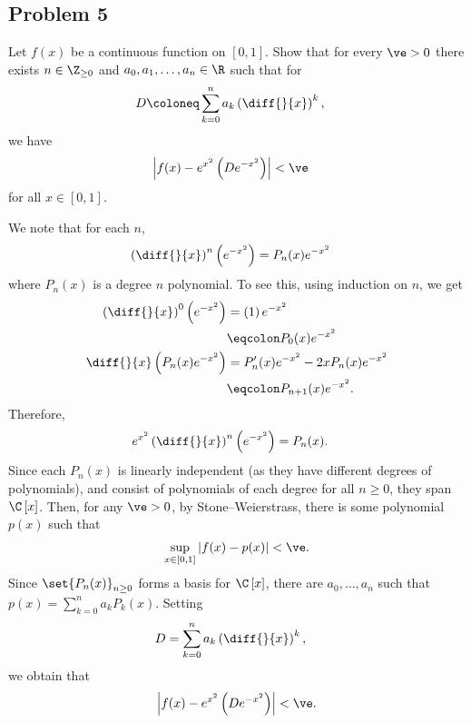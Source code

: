\documentclass[10pt]{mypackage}
\begin{document}
\subsection{Problem 5}%
\begin{problem}
  Let $f(x)$ be a continuous function on $[0,1]$. Show that for every $\ve > 0$ there exists $n\in \Z_{\geq 0}$ and $a_0,a_1,\dots,a_n\in \R$ such that for
  \begin{align*}
    D &\coloneq \sum_{k=0}^{n} a_k\left( \diff{}{x} \right)^{k},
  \end{align*}
  we have
  \begin{align*}
    \left\vert f(x)-e^{x^2}\left( De^{-x^2} \right) \right\vert &< \ve
  \end{align*}
  for all $x\in [0,1]$.
\end{problem}
We note that for each $n$,
\begin{align*}
  \left( \diff{}{x} \right)^{n}\left( e^{-x^2} \right) &= P_n(x)e^{-x^2}
\end{align*}
where $P_n(x)$ is a degree $n$ polynomial. To see this, using induction on $n$, we get
\begin{align*}
  \left( \diff{}{x} \right)^{0}\left( e^{-x^2} \right) &= \left( 1 \right)e^{-x^2}\\
                                                       &\eqcolon P_0(x)e^{-x^2}\\
  \diff{}{x}\left( P_n(x)e^{-x^2} \right) &= P_n'(x)e^{-x^2} - 2xP_n(x)e^{-x^2}\\
                                          &\eqcolon P_{n+1}(x)e^{-x^2}.
\end{align*}
Therefore,
\begin{align*}
  e^{x^2}\left( \diff{}{x} \right)^{n}\left( e^{-x^2} \right) &= P_n(x).
\end{align*}
Since each $P_n(x)$ is linearly independent (as they have different degrees of polynomials), and consist of polynomials of each degree for all $n\geq 0$, they span $\C\left[ x \right]$. Then, for any $\ve > 0$, by Stone--Weierstrass, there is some polynomial $p(x)$ such that
\begin{align*}
  \sup_{x\in [0,1]}\left\vert f(x) - p(x) \right\vert < \ve.
\end{align*}
Since $\set{P_n(x)}_{n\geq 0}$ forms a basis for $\C\left[ x \right]$, there are $a_0,\dots,a_n$ such that $p(x) = \sum_{k=0}^{n}a_kP_k\left( x \right)$. Setting
\begin{align*}
  D &= \sum_{k=0}^{n}a_k \left( \diff{}{x} \right)^{k},
\end{align*}
we obtain that
\begin{align*}
  \left\vert f(x)-e^{x^2}\left( De^{-x^2} \right) \right\vert < \ve.
\end{align*}
\end{document}

